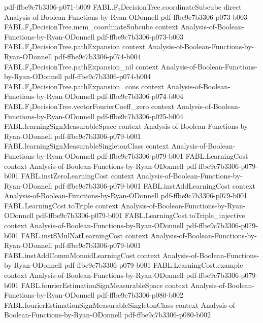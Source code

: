 \begin{theorem}
  {pdf-ffbe9c7b3306-p071-b009}
\proofstep
  {FABL.F₂DecisionTree.coordinateSubcube}
  {direct}
  {Analysis-of-Boolean-Functions-by-Ryan-ODonnell}
  {pdf-ffbe9c7b3306-p073-b003}
\proofstep
  {FABL.F₂DecisionTree.mem_coordinateSubcube}
  {context}
  {Analysis-of-Boolean-Functions-by-Ryan-ODonnell}
  {pdf-ffbe9c7b3306-p073-b003}
\proofstep
  {FABL.F₂DecisionTree.pathExpansion}
  {context}
  {Analysis-of-Boolean-Functions-by-Ryan-ODonnell}
  {pdf-ffbe9c7b3306-p074-b004}
\proofstep
  {FABL.F₂DecisionTree.pathExpansion_nil}
  {context}
  {Analysis-of-Boolean-Functions-by-Ryan-ODonnell}
  {pdf-ffbe9c7b3306-p074-b004}
\proofstep
  {FABL.F₂DecisionTree.pathExpansion_cons}
  {context}
  {Analysis-of-Boolean-Functions-by-Ryan-ODonnell}
  {pdf-ffbe9c7b3306-p074-b004}
\proofstep
  {FABL.F₂DecisionTree.vectorFourierCoeff_zero}
  {context}
  {Analysis-of-Boolean-Functions-by-Ryan-ODonnell}
  {pdf-ffbe9c7b3306-p025-b004}
\proofstep
  {FABL.learningSignMeasurableSpace}
  {context}
  {Analysis-of-Boolean-Functions-by-Ryan-ODonnell}
  {pdf-ffbe9c7b3306-p079-b001}
\proofstep
  {FABL.learningSignMeasurableSingletonClass}
  {context}
  {Analysis-of-Boolean-Functions-by-Ryan-ODonnell}
  {pdf-ffbe9c7b3306-p079-b001}
\proofstep
  {FABL.LearningCost}
  {context}
  {Analysis-of-Boolean-Functions-by-Ryan-ODonnell}
  {pdf-ffbe9c7b3306-p079-b001}
\proofstep
  {FABL.instZeroLearningCost}
  {context}
  {Analysis-of-Boolean-Functions-by-Ryan-ODonnell}
  {pdf-ffbe9c7b3306-p079-b001}
\proofstep
  {FABL.instAddLearningCost}
  {context}
  {Analysis-of-Boolean-Functions-by-Ryan-ODonnell}
  {pdf-ffbe9c7b3306-p079-b001}
\proofstep
  {FABL.LearningCost.toTriple}
  {context}
  {Analysis-of-Boolean-Functions-by-Ryan-ODonnell}
  {pdf-ffbe9c7b3306-p079-b001}
\proofstep
  {FABL.LearningCost.toTriple_injective}
  {context}
  {Analysis-of-Boolean-Functions-by-Ryan-ODonnell}
  {pdf-ffbe9c7b3306-p079-b001}
\proofstep
  {FABL.instSMulNatLearningCost}
  {context}
  {Analysis-of-Boolean-Functions-by-Ryan-ODonnell}
  {pdf-ffbe9c7b3306-p079-b001}
\proofstep
  {FABL.instAddCommMonoidLearningCost}
  {context}
  {Analysis-of-Boolean-Functions-by-Ryan-ODonnell}
  {pdf-ffbe9c7b3306-p079-b001}
\proofstep
  {FABL.LearningCost.example}
  {context}
  {Analysis-of-Boolean-Functions-by-Ryan-ODonnell}
  {pdf-ffbe9c7b3306-p079-b001}
\proofstep
  {FABL.fourierEstimationSignMeasurableSpace}
  {context}
  {Analysis-of-Boolean-Functions-by-Ryan-ODonnell}
  {pdf-ffbe9c7b3306-p080-b002}
\proofstep
  {FABL.fourierEstimationSignMeasurableSingletonClass}
  {context}
  {Analysis-of-Boolean-Functions-by-Ryan-ODonnell}
  {pdf-ffbe9c7b3306-p080-b002}

\end{theorem}
